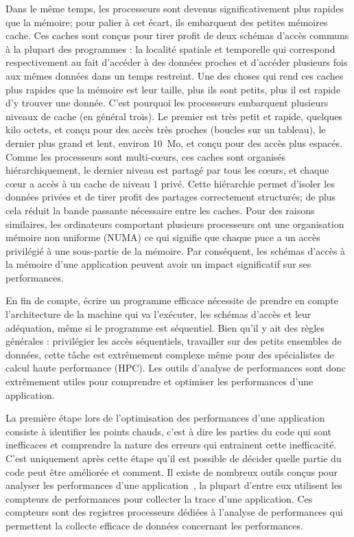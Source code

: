 Dans le même temps, les processeurs sont devenus significativement plus rapides que la mémoire; pour palier à cet écart, ils embarquent des petites mémoires cache.
Ces caches sont conçus pour tirer profit de deux schémas d'accès communs à la plupart des programmes : la localité spatiale et temporelle qui correspond respectivement au fait d'accéder à des données proches et d'accéder plusieurs fois aux mêmes données dans un temps restreint.
Une des choses qui rend ces caches plus rapides que la mémoire est leur taille, plus ils sont petits, plus il est rapide d'y trouver une donnée.
C'est pourquoi les processeurs embarquent plusieurs niveaux de cache (en général trois).
Le premier est très petit et rapide, quelques kilo octets, et conçu pour des accès très proches (boucles sur un tableau), le dernier plus grand et lent, environ \SI{10}{Mo}, et conçu pour des accès plus espacés.
Comme les processeurs sont multi-cœurs, ces caches sont organisés hiérarchiquement, le dernier niveau est partagé par tous les cœurs, et chaque cœur a accès à un cache de niveau $1$ privé.
Cette hiérarchie permet d'isoler les données privées et de tirer profit des partages correctement structurés; de plus cela réduit la bande passante nécessaire entre les caches.
Pour des raisons similaires, les ordinateurs comportant plusieurs processeurs ont une organisation mémoire non uniforme (NUMA) ce qui signifie que chaque puce a un accès privilégié à une sous-partie de la mémoire.
Par conséquent, les schémas d'accès à la mémoire d'une application peuvent avoir un impact significatif sur ses performances.

En fin de compte, écrire un programme efficace nécessite de prendre en compte l'architecture de la machine qui va l'exécuter, les schémas d'accès et leur  adéquation, même si le programme est séquentiel.
Bien qu'il y ait des règles générales : privilégier les accès séquentiels, travailler sur des petits ensembles de données, cette t\^ache est extrêmement complexe même pour des spécialistes de calcul haute performance (HPC).
Les outils d'analyse de performances sont donc extrêmement utiles pour comprendre et optimiser les performances d'une application.

La première étape lors de l'optimisation des performances d'une application consiste à identifier les points chauds, c'est à dire les parties du code qui sont inefficaces et comprendre la nature des erreurs qui entrainent cette inefficacité.
C'est uniquement après cette étape qu'il est possible de décider quelle partie du code peut être améliorée et comment.
Il existe de nombreux outils conçus pour analyser les performances d'une application~\cite{Pillet95PARAVER,Browne00Portable,Shende06Tau,Treibig10LIKWID,Adhianto10HPCTOOLKIT}, la plupart d'entre eux utilisent les compteurs de performances pour collecter la trace d'une application.
Ces compteurs sont des registres processeurs dédiées à l'analyse de performances qui permettent la collecte efficace de données concernant les performances.

